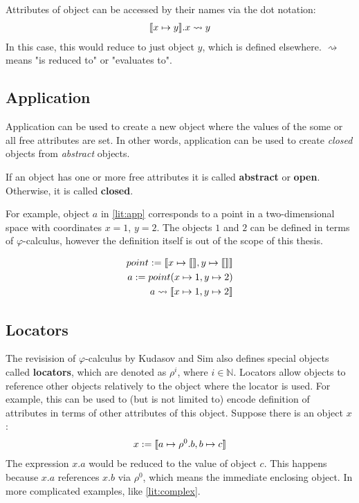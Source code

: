 Attributes of object can be accessed by their names via the dot notation:
\begin{align*}
    \llbracket x \mapsto y \rrbracket.x \rightsquigarrow y
\end{align*}
In this case, this would reduce to just object $y$, which is defined elsewhere. $\rightsquigarrow$ means "is reduced to" or "evaluates to".

\subsection{Application}
Application can be used to create a new object where the values of the some or all free attributes are set. In other words, application can be used to create \textit{closed} objects from \textit{abstract} objects.

\begin{definition}
    If an object has one or more free attributes it is called \textbf{abstract} or \textbf{open}. Otherwise, it is called \textbf{closed}.
\end{definition}

For example, object $a$ in \ref{lit:app} corresponds to a point in a two-dimensional space with coordinates $x = 1$, $y = 2$. The objects $1$ and $2$ can be defined in terms of $\varphi$-calculus, however the definition itself is out of the scope of this thesis.

\begin{align}
    point := \llbracket x \mapsto \llbracket  \rrbracket, y \mapsto \llbracket \rrbracket \rrbracket \\
    \label{lit:app}
    a := point(x \mapsto 1, y \mapsto 2)                           \\
    a \rightsquigarrow \llbracket x \mapsto 1, y \mapsto 2 \rrbracket
\end{align}


\subsection{Locators}

The revisision of $\varphi$-calculus by Kudasov and Sim \cite{kudasov} also defines special objects called \textbf{locators}, which are denoted as $\rho^i$, where $i \in \mathbb{N}$. Locators allow objects to reference other objects relatively to the object where the locator is used. For example, this can be used to (but is not limited to) encode definition of attributes in terms of other attributes of this object. Suppose there is an object $x$:
\begin{align*}
    x := \llbracket a \mapsto \rho^0.b, b \mapsto c \rrbracket
\end{align*}
The expression $x.a$ would be reduced to the value of object $c$. This happens because $x.a$ references $x.b$ via $\rho^0$, which means the immediate enclosing object. In more complicated examples, like \ref{lit:complex}.

